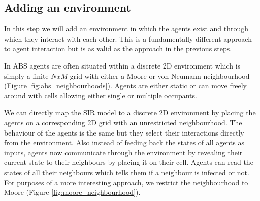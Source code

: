 \subsection{Adding an environment}
\label{sec:step5_environment}
In this step we will add an environment in which the agents exist and through which they interact with each other. This is a fundamentally different approach to agent interaction but is as valid as the approach in the previous steps. 

In ABS agents are often situated within a discrete 2D environment \cite{epstein_growing_1996} which is simply a finite $N x M$ grid with either a Moore or von Neumann neighbourhood (Figure \ref{fig:abs_neighbourhoods}). Agents are either static or can move freely around with cells allowing either single or multiple occupants.

We can directly map the SIR model to a discrete 2D environment by placing the agents on a corresponding 2D grid with an unrestricted neighbourhood. The behaviour of the agents is the same but they select their interactions directly from the environment. Also instead of feeding back the states of all agents as inputs, agents now communicate through the environment by revealing their current state to their neighbours by placing it on their cell. Agents can read the states of all their neighbours which tells them if a neighbour is infected or not. For purposes of a more interesting approach, we restrict the neighbourhood to Moore (Figure \ref{fig:moore_neighbourhood}).

